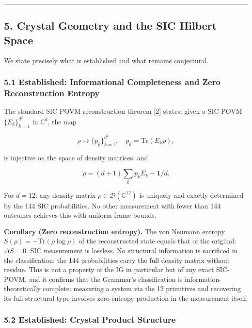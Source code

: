 \begin{center}\rule{0.5\linewidth}{0.5pt}\end{center}

\hypertarget{crystal-geometry-and-the-sic-hilbert-space}{%
\subsection{5. Crystal Geometry and the SIC Hilbert
Space}\label{crystal-geometry-and-the-sic-hilbert-space}}

We state precisely what is established and what remains conjectural.

\hypertarget{established-informational-completeness-and-zero-reconstruction-entropy}{%
\subsubsection{5.1 Established: Informational Completeness and Zero
Reconstruction
Entropy}\label{established-informational-completeness-and-zero-reconstruction-entropy}}

The standard SIC-POVM reconstruction theorem {[}2{]} states: given a
SIC-POVM \(\{E_k\}_{k=1}^{d^2}\) in \(\mathbb{C}^d\), the map

\[\rho \mapsto \{p_k\}_{k=1}^{d^2}, \quad p_k = \mathrm{Tr}(E_k \rho),\]

is injective on the space of density matrices, and

\[\rho = (d+1)\sum_k p_k E_k - \mathbf{1}/d.\]

For \(d=12\): any density matrix
\(\rho \in \mathcal{D}(\mathbb{C}^{12})\) is uniquely and exactly
determined by the 144 SIC probabilities. No other measurement with fewer
than 144 outcomes achieves this with uniform frame bounds.

\textbf{Corollary (Zero reconstruction entropy).} The von Neumann
entropy \(S(\rho) = -\mathrm{Tr}(\rho \log \rho)\) of the reconstructed
state equals that of the original: \(\Delta S = 0\). SIC measurement is
lossless. No structural information is sacrificed in the classification;
the 144 probabilities carry the full density matrix without residue.
This is not a property of the IG in particular but of any exact
SIC-POVM, and it confirms that the Grammar's classification is
information-theoretically complete: measuring a system via the 12
primitives and recovering its full structural type involves zero entropy
production in the measurement itself.

\hypertarget{established-crystal-product-structure}{%
\subsubsection{5.2 Established: Crystal Product
Structure}\label{established-crystal-product-structure}}

